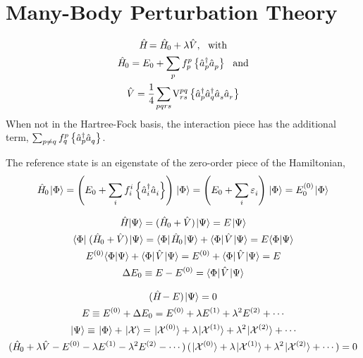\documentclass[thesis.tex]{subfiles}
\begin{document}
\section{Many-Body Perturbation Theory}

\begin{gather}
  \Ham = \Ham_{0} + \lambda\hat{V},\ \ \text{with} \notag \\
  \Ham_{0} = E_{0} + \sum_{\mathclap{p}}\fint{p}{p}\normord{\co{p}\ao{p}}\ \ \text{and} \notag \\
  \hat{V} = \frac{1}{4}\sum_{\mathclap{pqrs}}\vint{pq}{rs}\normord{\co{p}\co{q}\ao{s}\ao{r}}
\end{gather}
When not in the Hartree-Fock basis, the interaction piece has the additional term, $\sum_{p\neq q}f^{p}_{q}\left\{\hat{a}_{p}^{\dagger}\hat{a}_{q}^{}\right\}$.

The reference state is an eigenstate of the zero-order piece of the Hamiltonian,
\begin{equation}
  \Ham_{0}\ket{\Phi} = \left(E_{0} + \sum_{\mathclap{i}}\fint{i}{i}\normord{\co{i}\ao{i}}\right)\ket{\Phi} = \left(E_{0} + \sum_{\mathclap{i}}\Edenom{}{i}\right)\ket{\Phi} = E^{(0)}_{0}\ket{\Phi}
\end{equation}

\begin{gather}
  \Ham\corrket = \mathop{(\Ham_{0} + \hat{V})}\corrket = E\corrket \\
  \refbra\mathop{(\Ham_{0} + \hat{V})}\corrket = \refbra\Ham_{0}\corrket + \refbra\hat{V}\corrket = E\braket{\Phi}{\Psi} \\
  E^{(0)}\braket{\Phi}{\Psi} + \refbra\hat{V}\corrket = E^{(0)} + \refbra\hat{V}\corrket = E \\
  \Delta E_{0} \equiv E - E^{(0)} = \refbra\hat{V}\corrket \label{eq:MBPT_delE}
\end{gather}

\begin{gather}
  \mathop{(\hat{H}\hspace{-1.5pt} - E)}\hspace{1pt}\lvert \Psi \rangle = 0 \\
  E \equiv E^{(0)} + \Delta E_{0} = E^{(0)} + \lambda E^{(1)} + \lambda^{2} E^{(2)} + \cdots \\
  \hspace{1pt}\lvert \Psi \rangle \equiv \hspace{1pt}\lvert \Phi \rangle + \hspace{1pt}\lvert \mathcal{X} \rangle = \hspace{1pt}\lvert \mathcal{X}^{(0)} \rangle + \lambda\hspace{1pt}\lvert \mathcal{X}^{(1)} \rangle + \lambda^{2}\hspace{1pt}\lvert \mathcal{X}^{(2)} \rangle + \cdots \\
  \mathop{(\hat{H}\hspace{-1.5pt}_{0} + \lambda\hat{V} - E^{(0)} - \lambda E^{(1)} - \lambda^{2} E^{(2)} - \cdots)}\mathop{(\hspace{1pt}\lvert \mathcal{X}^{(0)} \rangle + \lambda\hspace{1pt}\lvert \mathcal{X}^{(1)} \rangle + \lambda^{2}\hspace{1pt}\lvert \mathcal{X}^{(2)} \rangle + \cdots)} = 0
\end{gather}
\end{document}
